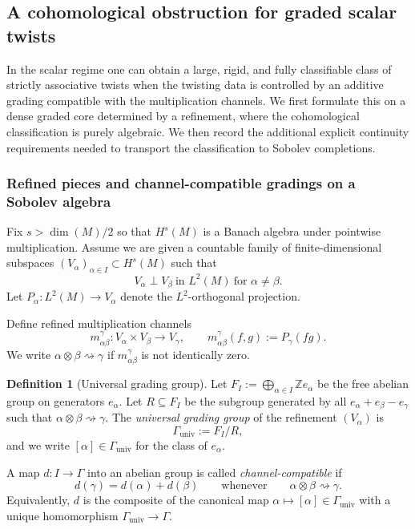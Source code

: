 \documentclass[11pt]{amsart}
\theoremstyle{plain}
\theoremstyle{definition}
\newtheorem{definition}[theorem]{Definition}
\theoremstyle{remark}
\begin{document}
\subsection{A cohomological obstruction for graded scalar twists}\label{subsec:cohomological-obstruction}

In the scalar regime one can obtain a large, rigid, and fully classifiable class of strictly associative twists
when the twisting data is controlled by an additive grading compatible with the multiplication channels.
We first formulate this on a dense graded core determined by a refinement, where the cohomological classification is purely algebraic.
We then record the additional explicit continuity requirements needed to transport the classification to Sobolev completions.

\subsubsection*{Refined pieces and channel-compatible gradings on a Sobolev algebra}

Fix $s>\dim(M)/2$ so that $H^s(M)$ is a Banach algebra under pointwise multiplication.
Assume we are given a countable family of finite-dimensional subspaces $(V_\alpha)_{\alpha\in I}\subset H^s(M)$
such that
\begin{equation}\label{eq:Hs-refinement}
V_\alpha\perp V_\beta\ \text{in }L^2(M)\ \text{for }\alpha\neq\beta.
\end{equation}
Let $P_\alpha:L^2(M)\to V_\alpha$ denote the $L^2$-orthogonal projection.

Define refined multiplication channels
\[
m^\gamma_{\alpha\beta}:V_\alpha\times V_\beta\to V_\gamma,\qquad
m^\gamma_{\alpha\beta}(f,g):=P_\gamma(fg).
\]
We write $\alpha\otimes\beta\rightsquigarrow\gamma$ if $m^\gamma_{\alpha\beta}$ is not identically zero.

\begin{definition}[Universal grading group]\label{def:Gamma-univ}
Let $F_I:=\bigoplus_{\alpha\in I}\mathbb{Z}e_\alpha$ be the free abelian group on generators $e_\alpha$.
Let $R\subseteq F_I$ be the subgroup generated by all $e_\alpha+e_\beta-e_\gamma$ such that
$\alpha\otimes\beta\rightsquigarrow\gamma$.
The \emph{universal grading group} of the refinement $(V_\alpha)$ is
\[
\Gamma_{\mathrm{univ}}:=F_I/R,
\]
and we write $[\alpha]\in\Gamma_{\mathrm{univ}}$ for the class of $e_\alpha$.
\end{definition}

A map $d:I\to\Gamma$ into an abelian group is called \emph{channel-compatible} if
\[
d(\gamma)=d(\alpha)+d(\beta)\qquad\text{whenever}\qquad \alpha\otimes\beta\rightsquigarrow\gamma.
\]
Equivalently, $d$ is the composite of the canonical map $\alpha\mapsto[\alpha]\in\Gamma_{\mathrm{univ}}$
with a unique homomorphism $\Gamma_{\mathrm{univ}}\to\Gamma$.
\end{document}
